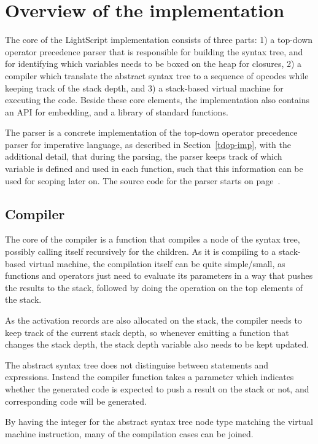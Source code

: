 \documentclass[11pt]{report}
\begin{document}
\section{Overview of the implementation}
The core of the LightScript implementation consists of three parts: 1) a top-down operator precedence parser that is responsible for building the syntax tree, and for identifying which variables needs to be boxed on the heap for closures, 2) a compiler which translate the abstract syntax tree to a sequence of opcodes while keeping track of the stack depth, and 3) a stack-based virtual machine for executing the code.
Beside these core elements, the implementation also contains an API for embedding, and a library of standard functions.

The parser is a concrete implementation of the top-down operator precedence parser for imperative language, as described in Section~\ref{tdop-imp}, with the additional detail, that during the parsing, the parser keeps track of which variable is defined and used in each function, such that this information can be used for scoping later on. 
The source code for the parser starts on page~\pageref{code-lightscript-parser}.

\subsection{Compiler}

The core of the compiler is a function that compiles a node of the syntax tree, possibly calling itself recursively for the children.
As it is compiling to a stack-based virtual machine, the compilation itself can be quite simple/small, as functions and operators just need to evaluate its parameters in a way that pushes the results to the stack, followed by doing the operation on the top elements of the stack.

As the activation records are also allocated on the stack, the compiler needs to keep track of the current stack depth, so whenever emitting a function that changes the stack depth, the stack depth variable also needs to be kept updated.

The abstract syntax tree does not distinguise between statements and expressions. Instead the compiler function takes a parameter which indicates whether the generated code is expected to push a result on the stack or not, and corresponding code will be generated. 

By having the integer for the abstract syntax tree node type matching the virtual machine instruction, many of the compilation cases can be joined.
\end{document}
